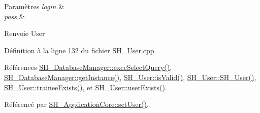 \begin{DoxyParams}{Paramètres}
{\em login} & \\
\hline
{\em pass} & \\
\hline
\end{DoxyParams}
\begin{DoxyReturn}{Renvoie}
User 
\end{DoxyReturn}


Définition à la ligne \hyperlink{SH__User_8cpp_source_l00132}{132} du fichier \hyperlink{SH__User_8cpp_source}{S\-H\-\_\-\-User.\-cpp}.



Références \hyperlink{classSH__DatabaseManager_ab8f9850cb68444ab9a4e613b36a3b044}{S\-H\-\_\-\-Database\-Manager\-::exec\-Select\-Query()}, \hyperlink{classSH__DatabaseManager_a31198eb4de0f8b18e3fa0eed09f24d19}{S\-H\-\_\-\-Database\-Manager\-::get\-Instance()}, \hyperlink{classSH__User_a07de5c02b2a02b3bb2b0aaf0886bb4d9}{S\-H\-\_\-\-User\-::is\-Valid()}, \hyperlink{classSH__User_a96c0ebb3f11c1654935aaecb92295724}{S\-H\-\_\-\-User\-::\-S\-H\-\_\-\-User()}, \hyperlink{classSH__User_adfc35c967cb405f4a14886676612fbb7}{S\-H\-\_\-\-User\-::trainee\-Exists()}, et \hyperlink{classSH__User_a64161b35866b1c635d5f4214095a2b1e}{S\-H\-\_\-\-User\-::user\-Exists()}.



Référencé par \hyperlink{classSH__ApplicationCore_a2dd5c029a2ea348f1dfd0a60dea476e4}{S\-H\-\_\-\-Application\-Core\-::set\-User()}.



